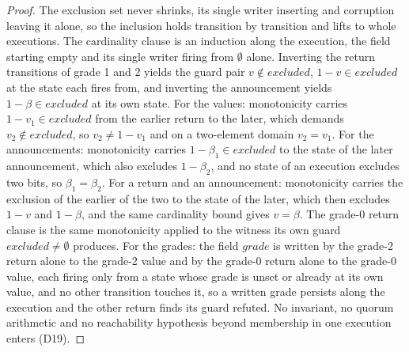\begin{proof}\leanok
  The exclusion set never shrinks, its single writer inserting and corruption leaving it alone, so the inclusion holds transition by transition and lifts to whole executions.\leanok{} The cardinality clause is an induction along the execution, the field starting empty and its single writer firing from $\emptyset$ alone.\leanok{} Inverting the return transitions of grade 1 and 2 yields the guard pair $v \notin excluded$, $1-v \in excluded$ at the state each fires from, and inverting the announcement yields $1-\beta \in excluded$ at its own state.\leanok{} For the values: monotonicity carries $1-v_1 \in excluded$ from the earlier return to the later, which demands $v_2 \notin excluded$, so $v_2 \neq 1-v_1$ and on a two-element domain $v_2 = v_1$.
  For the announcements: monotonicity carries $1-\beta_1 \in excluded$ to the state of the later announcement, which also excludes $1-\beta_2$, and no state of an execution excludes two bits, so $\beta_1 = \beta_2$.
  For a return and an announcement: monotonicity carries the exclusion of the earlier of the two to the state of the later, which then excludes $1-v$ and $1-\beta$, and the same cardinality bound gives $v = \beta$.
  The grade-0 return clause is the same monotonicity applied to the witness its own guard $excluded \neq \emptyset$ produces.
  For the grades: the field $grade$ is written by the grade-2 return alone to the grade-2 value and by the grade-0 return alone to the grade-0 value, each firing only from a state whose grade is unset or already at its own value, and no other transition touches it, so a written grade persists along the execution and the other return finds its guard refuted.\leanok{}
  No invariant, no quorum arithmetic and no reachability hypothesis beyond membership in one execution enters (D19).
\end{proof}
